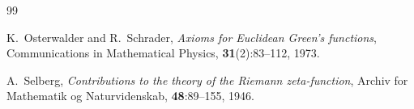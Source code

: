\documentclass[11pt,a4paper]{article}
\theoremstyle{definition}
\begin{document}
\begin{thebibliography}{99}

K.~Osterwalder and R.~Schrader,
\textit{Axioms for Euclidean Green's functions},
Communications in Mathematical Physics, \textbf{31}(2):83--112, 1973.

A.~Selberg,
\textit{Contributions to the theory of the Riemann zeta-function},
Archiv for Mathematik og Naturvidenskab, \textbf{48}:89--155, 1946.

\end{thebibliography}
\end{document}
